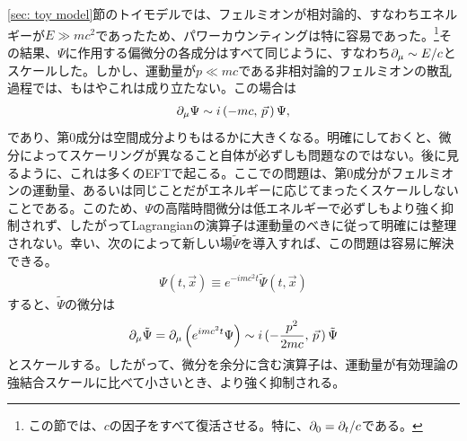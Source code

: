 

 \label{sec: NR fermions in vacuum}

\ref{sec: toy model}節のトイモデルでは、フェルミオンが相対論的、すなわちエネルギーが$E \gg m c^2$であったため、パワーカウンティングは特に容易であった。\footnote{この節では、$c$の因子をすべて復活させる。特に、$\partial_0 = \partial_t / c$である。}その結果、$\Psi$に作用する偏微分の各成分はすべて同じように、すなわち$\partial_\mu \sim E /c$とスケールした。しかし、運動量が$p \ll mc$である非相対論的フェルミオンの散乱過程では、もはやこれは成り立たない。この場合は
%
\begin{align}
	\partial_\mu \Psi \sim i \, (- m c, \, \vec p \, ) \, \Psi,
\end{align}
%
であり、第0成分は空間成分よりもはるかに大きくなる。明確にしておくと、微分によってスケーリングが異なること自体が必ずしも問題なのではない。後に見るように、これは多くのEFTで起こる。ここでの問題は、第0成分がフェルミオンの運動量、あるいは同じことだがエネルギーに応じてまったくスケールしないことである。このため、$\Psi$の高階時間微分は低エネルギーで必ずしもより強く抑制されず、したがってLagrangianの演算子は運動量のべきに従って明確には整理されない。幸い、次のによって新しい場$\tilde \Psi$を導入すれば、この問題は容易に解決できる。
%
\begin{align} \label{Psi tilde def vacuum}
	\Psi (t, \vec x)  \equiv e^{- i m c^2 t} \tilde \Psi (t, \vec x) 
\end{align}
%
すると、$\tilde \Psi$の微分は
%
\begin{align} \label{Psi tilde derivatives}
	\partial_\mu  \tilde \Psi = \partial_\mu \left( e^{i m c^2 t} \Psi \right) \sim i \, (- \frac{p^2}{2mc}, \, \vec p \, ) \, \tilde \Psi
\end{align}
%
とスケールする。したがって、微分を余分に含む演算子は、運動量が有効理論の強結合スケールに比べて小さいとき、より強く抑制される。

